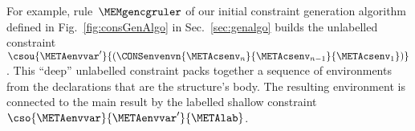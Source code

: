 \documentclass{jfp1}
\begin{document}
For example, rule~$\MEMgencgruler$ of our initial constraint
generation algorithm defined in Fig.~\ref{fig:consGenAlgo} in
Sec.~\ref{sec:genalgo} builds the unlabelled constraint
\(
  \csou{\METAenvvar'}
       {(\CONSenvenvn{\METAcsenv_n}{\METAcsenv_{n-1}}{\METAcsenv_1})}
\).
This ``deep'' unlabelled constraint packs together a sequence of environments
from the declarations that are the structure's body.
The resulting environment is connected to the main result by the
labelled shallow constraint
$\cso{\METAenvvar}{\METAenvvar'}{\METAlab}$.


\end{document}
